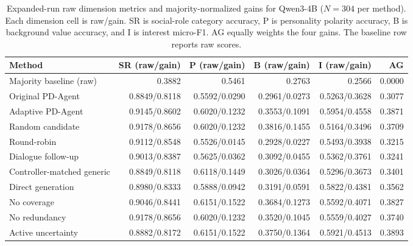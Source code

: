 \documentclass{ieeeaccess}
\begin{document}
\renewcommand{\thetable}{S3b}
\begin{table}[H]
\centering
\footnotesize
\setlength{\tabcolsep}{4pt}
\caption{Expanded-run raw dimension metrics and majority-normalized gains for Qwen3-4B ($N=304$ per method). Each dimension cell is raw/gain. SR is social-role category
accuracy, P is personality polarity accuracy, B is background value accuracy, and I is
interest micro-F1. AG equally weights the four gains. The baseline row reports raw scores.}
\label{tab:expanded-raw-qwen4}
\begin{tabular*}{\textwidth}{@{\extracolsep{\fill}}lrrrrr@{}}
\toprule
Method & SR (raw/gain) & P (raw/gain) & B (raw/gain) & I (raw/gain) & AG \\
\midrule
Majority baseline (raw) & 0.3882 & 0.5461 & 0.2763 & 0.2566 & 0.0000 \\
\midrule
Original PD-Agent & 0.8849/0.8118 & 0.5592/0.0290 & 0.2961/0.0273 & 0.5263/0.3628 & 0.3077 \\
Adaptive PD-Agent & 0.9145/0.8602 & 0.6020/0.1232 & 0.3553/0.1091 & 0.5954/0.4558 & 0.3871 \\
Random candidate & 0.9178/0.8656 & 0.6020/0.1232 & 0.3816/0.1455 & 0.5164/0.3496 & 0.3709 \\
Round-robin & 0.9112/0.8548 & 0.5526/0.0145 & 0.2928/0.0227 & 0.5493/0.3938 & 0.3215 \\
Dialogue follow-up & 0.9013/0.8387 & 0.5625/0.0362 & 0.3092/0.0455 & 0.5362/0.3761 & 0.3241 \\
Controller-matched generic & 0.8849/0.8118 & 0.6118/0.1449 & 0.3026/0.0364 & 0.5296/0.3673 & 0.3401 \\
Direct generation & 0.8980/0.8333 & 0.5888/0.0942 & 0.3191/0.0591 & 0.5822/0.4381 & 0.3562 \\
No coverage & 0.9046/0.8441 & 0.6151/0.1522 & 0.3684/0.1273 & 0.5592/0.4071 & 0.3827 \\
No redundancy & 0.9178/0.8656 & 0.6020/0.1232 & 0.3520/0.1045 & 0.5559/0.4027 & 0.3740 \\
Active uncertainty & 0.8882/0.8172 & 0.6151/0.1522 & 0.3750/0.1364 & 0.5921/0.4513 & 0.3893 \\
\bottomrule
\end{tabular*}
\end{table}
\end{document}
